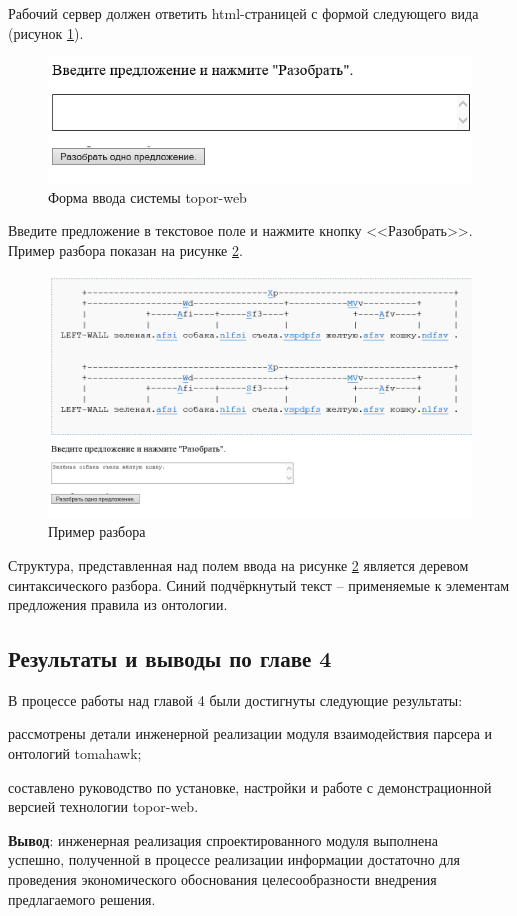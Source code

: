 Рабочий сервер должен ответить html-страницей с формой следующего
вида (рисунок \ref{fig:form}).

\begin{figure}[H]
	\centering
		\includegraphics[scale=1.0]{images/form.png}
	\caption{\small Форма ввода системы topor-web}
	\label{fig:form}
\end{figure} 

Введите предложение в текстовое поле и нажмите кнопку <<Разобрать>>.
Пример разбора показан на рисунке \ref{fig:parse}.

\begin{figure}[H]
	\centering
		\includegraphics[scale=0.5]{images/parse.png}
	\caption{\small Пример разбора}
	\label{fig:parse}
\end{figure} 

Структура, представленная над полем ввода на рисунке \ref{fig:parse} является
деревом синтаксического разбора. Синий подчёркнутый текст – применяемые
к элементам предложения правила из онтологии.

\subsection{Результаты и выводы по главе 4}

В процессе работы над главой 4 были достигнуты следующие результаты:
\begin{list}{}{\leftmargin=1.5cm}
	\item рассмотрены детали инженерной реализации модуля взаимодействия парсера и онтологий tomahawk;
	\item составлено руководство по установке, настройки и работе с демонстрационной версией технологии topor-web.
\end{list}

\textbf{Вывод}: инженерная реализация спроектированного модуля выполнена\\ успешно, полученной в процессе реализации информации достаточно для проведения экономического обоснования целесообразности внедрения предлагаемого решения.
